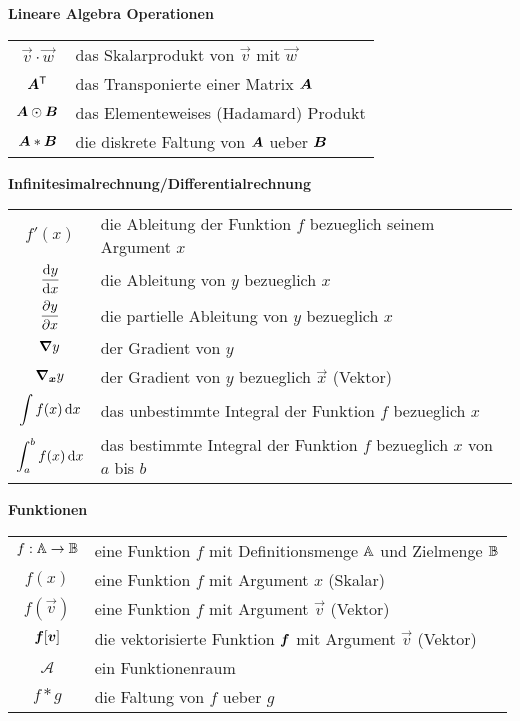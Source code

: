 \begin{center}\textbf{Lineare Algebra Operationen}\end{center}
\begin{tabular}{cl}
  $\vec{v} \cdot \vec{w}$ & das Skalarprodukt von $\vec{v}$ mit $\vec{w}$ \\
  $\bm{A}^{\mathsf{T}}$ & das Transponierte einer Matrix $\bm{A}$ \\
  $\bm{A} \odot \bm{B}$ & das Elementeweises (Hadamard) Produkt \\
  $\bm{A} * \bm{B}$ & die diskrete Faltung von $\bm{A}$ ueber $\bm{B}$

\end{tabular}

\begin{center}\textbf{Infinitesimalrechnung/Differentialrechnung}\end{center}
\begin{tabular}{cl}
  $f'(x)$ & die Ableitung der Funktion $f$ bezueglich seinem Argument $x$ \\
  $\displaystyle\frac{\text{d}y}{\text{d}x}$ & die Ableitung von $y$ bezueglich $x$ \\[2ex]
  $\displaystyle\frac{\partial y}{\partial x}$ & die partielle Ableitung von $y$ bezueglich $x$ \\[2ex]
  $\bm{\nabla} y$ & der Gradient von $y$\\
  $\bm{\nabla}_{\bm{x}}y$ & der Gradient von $y$ bezueglich $\vec{x}$ (Vektor) \\
  $\displaystyle\int f(x)\,\text{d}x$ & das unbestimmte Integral der Funktion $f$ bezueglich $x$ \\
  $\displaystyle\int_a^b f(x)\,\text{d}x$ & das bestimmte Integral der Funktion $f$ bezueglich $x$ von $a$ bis $b$ \\

\end{tabular}

\begin{center}\textbf{Funktionen}\end{center}
\begin{tabular}{cl}
  $f: \mathbb{A} \to \mathbb{B}$ & eine Funktion $f$ mit Definitionsmenge $\mathbb{A}$ und Zielmenge $\mathbb{B}$ \\
  $f(x)$ & eine Funktion $f$ mit Argument $x$ (Skalar) \\
  $f(\vec{v})$ & eine Funktion $f$ mit Argument $\vec{v}$ (Vektor) \\
  $\bm{f}[\bm{v}]$ & die vektorisierte Funktion $\bm{f}$ mit Argument $\vec{v}$ (Vektor) \\
  $\mathcal{A}$ & ein Funktionenraum \\
  $f * g$ & die Faltung von $f$ ueber $g$ \\

\end{tabular}

